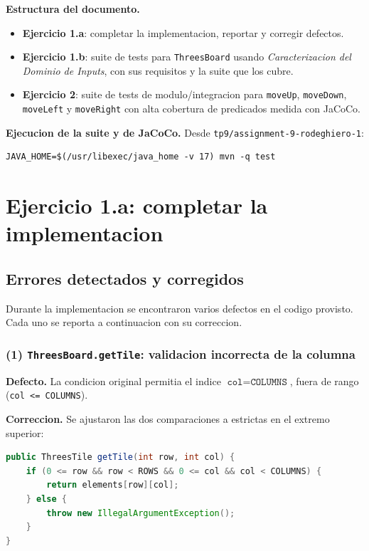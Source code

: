 \documentclass[12pt,a4paper]{article}
\begin{document}
\textbf{Estructura del documento.}

\begin{itemize}
  \item \textbf{Ejercicio 1.a}: completar la implementacion, reportar y corregir defectos.
  \item \textbf{Ejercicio 1.b}: suite de tests para \texttt{ThreesBoard} usando
  \emph{Caracterizacion del Dominio de Inputs}, con sus requisitos y la suite que los cubre.
  \item \textbf{Ejercicio 2}: suite de tests de modulo/integracion para \texttt{moveUp},
  \texttt{moveDown}, \texttt{moveLeft} y \texttt{moveRight} con alta cobertura de predicados
  medida con JaCoCo.
\end{itemize}

\textbf{Ejecucion de la suite y de JaCoCo.} Desde \texttt{tp9/assignment-9-rodeghiero-1}:

\begin{lstlisting}[style=codestyle]
JAVA_HOME=$(/usr/libexec/java_home -v 17) mvn -q test
\end{lstlisting}

\section{Ejercicio 1.a: completar la implementacion}

\subsection{Errores detectados y corregidos}

Durante la implementacion se encontraron varios defectos en el codigo provisto. Cada uno se
reporta a continuacion con su correccion.

\subsubsection*{(1) \texttt{ThreesBoard.getTile}: validacion incorrecta de la columna}

\textbf{Defecto.} La condicion original permitia el indice $\texttt{col} = \texttt{COLUMNS}$,
fuera de rango (\texttt{col <= COLUMNS}).

\textbf{Correccion.} Se ajustaron las dos comparaciones a estrictas en el extremo superior:

\begin{lstlisting}[style=codestyle,language=Java]
public ThreesTile getTile(int row, int col) {
    if (0 <= row && row < ROWS && 0 <= col && col < COLUMNS) {
        return elements[row][col];
    } else {
        throw new IllegalArgumentException();
    }
}
\end{lstlisting}
\end{document}
